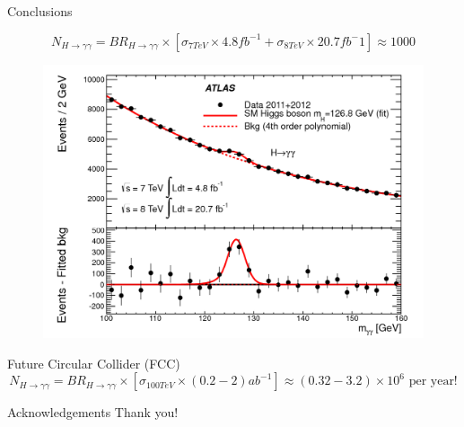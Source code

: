 \documentclass[10pt,t]{beamer}
\begin{document}
\begin{frame}{Conclusions}
     
     \begin{equation*}
         N_{H\rightarrow\gamma\gamma} = BR_{H\rightarrow\gamma\gamma} \times\left[\sigma_{7TeV} \times 4.8fb^{-1} + \sigma_{8TeV} \times 20.7fb^-1\right] \approx 1000
     \end{equation*}
    
     \begin{figure}
                \centering
                \includegraphics[scale=0.15]{Images/Discovery.jpg}
                 
     \end{figure}
    \pause

    \center Future Circular Collider (FCC)
     \begin{equation*}
         N_{H\rightarrow\gamma\gamma} = BR_{H\rightarrow\gamma\gamma} \times\left[\sigma_{100TeV} \times (0.2-2)ab^{-1}\right] \approx (0.32-3.2) \times 10^6 \text{ per year!}
     \end{equation*}
     

\end{frame}




\begin{frame}{Acknowledgements}
    \vspace{3cm}
    \centering \Huge Thank you!
\end{frame}
\end{document}
